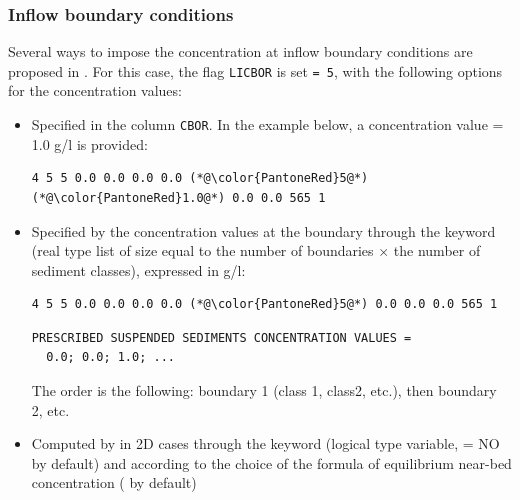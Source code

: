 \subsubsection{Inflow boundary conditions}
Several ways to impose the concentration at inflow boundary conditions are proposed in \gaia. For this case, the flag \texttt{LICBOR} is set \texttt{= 5}, with the following options for the concentration values:
\begin{itemize}
\item Specified in the column \texttt{CBOR}. In the example below, a concentration value {\ttfamily = 1.0} g/l is provided:
\begin{lstlisting}[frame=trBL]
4 5 5 0.0 0.0 0.0 0.0 (*@\color{PantoneRed}5@*) (*@\color{PantoneRed}1.0@*) 0.0 0.0 565 1
\end{lstlisting}
\item Specified by the concentration values at the boundary through the keyword  (real type list of size equal to the number of boundaries $\times$ the number of sediment classes), expressed in g/l:
\begin{lstlisting}[frame=trBL]
4 5 5 0.0 0.0 0.0 0.0 (*@\color{PantoneRed}5@*) 0.0 0.0 0.0 565 1
\end{lstlisting}
\begin{lstlisting}[frame=trBL]
  PRESCRIBED SUSPENDED SEDIMENTS CONCENTRATION VALUES =
  0.0; 0.0; 1.0; ...
\end{lstlisting}
The order is the following: boundary 1 (class 1, class2, etc.), then boundary 2, etc.
\item Computed by \gaia{} in 2D cases through the keyword  (logical type variable, {\ttfamily = NO} by default) and according to the choice of the formula of equilibrium near-bed concentration ( by default)


\end{itemize}
